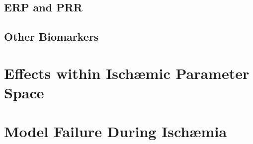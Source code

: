 \documentclass[../thesis-main.tex]{subfiles}
\begin{document}
\subsection{ERP and PRR}
\label{subsec:isch-erpprr-response}

\subsection{Other Biomarkers}
\label{subsec:isch-other-response}

\section{Effects within Isch\ae{}mic Parameter Space}
\label{sec:isch-space}

\section{Model Failure During Isch\ae{}mia}
\label{sec:isch-modelFailure}

\biblio
\end{document}

